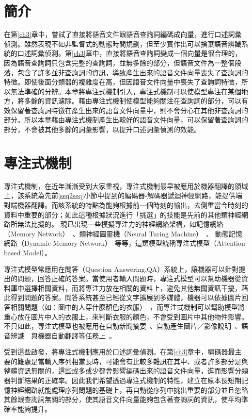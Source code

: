 \label{ch4}
\section{簡介}
在第\ref{ch3}章中，嘗試了直接將語音文件跟語音查詢詞編碼成向量，進行口述詞彙偵測。雖然表現不如非監督式的動態時間規劃，但至少實作出可以捨棄語音辨識系統的口述詞彙偵測。第\ref{ch3}章中，直接將語音查詢詞變成一個向量是很合理的，因為語音查詢詞只包含完整的查詢詞，並無多餘的部分，但語音文件為一整個段落，包含了許多並非查詢詞的資訊，導致產生出來的語音文件向量喪失了查詢詞的特徵。即使後面分類器的複雜度在高，但因語音文件向量中喪失了查詢詞特徵，所以無法準確的分辨。本章將專注式機制引入，專注式機制可以使模型專注在某個地方，將多餘的資訊濾除。藉由專注式機制使模型能夠關注在查詢詞的部分，可以有效保留著查詢詞特徵在產生出來的語音文件向量中，則不會分心在其他非查詢詞的部分。所以本章藉由專注式機制產生出較好的語音文件向量，可以保留著查詢詞的部分，不會被其他多餘的詞彙影響，以提升口述詞彙偵測的效能。
\vspace{10cm}
\section{專注式機制}
專注式機制，在近年漸漸受到大家重視，專注式機制最早被應用於機器翻譯的領域上，該系統為先前\ref{seq2seq}小節中提到的編碼器-解碼器遞迴神經網路，能提供端對端機器翻譯。而該系統的特點為能夠根據前一個時刻的輸出，去側重當今時刻的資料中重要的部分；如此這種根據狀況進行「挑選」的技能是先前的其他類神經網路所無法比擬的。
現已出現一些模擬專注力的神經網絡架構，如記憶網絡（Memory
Network）~\cite{sukhbaatar2015end}、類神經圖靈機（Neural Turing
Machine）~\cite{graves2014neural}、 動態記憶網路（Dynamic
Memory
Network）~\cite{kumar2015ask}等等，這類模型統稱專注式模型（Attention-based
Model）。

專注式模型常應用在問答（Question
Answering,QA）系統上，讓機器可以針對提出的問題，回答正確的答案。當使用者輸入問題時，專注式模型可以幫助機器從資料庫中選擇相關資料，而將專注力放在相關的資料上，避免其他無關資訊干擾，藉此得到問題的答案。問答系統甚至已經從文字擴展到多媒體，機器可以依據圖片回答相關問題（如：圖中的人穿什麼顏色的衣服）~\cite{agrawal2015vqa}，而專注式機制可以幫助模型將重心放在圖片中人的衣服上，來判斷衣服的顏色，不會受到圖片中其他物件影響。不只如此，專注式模型也被應用在自動新聞摘要~\cite{rush2015neural}、自動產生圖片／影像說明~\cite{xu2015show}、語音辨識~\cite{chan2016listen}~與機器自動翻譯等任務上~\cite{bahdanau2014neural}。

受到這些啟發，將專注式機制應用於口述詞彙偵測。在第\ref{ch3}章中，編碼器最主要的難處是當輸入序列相當長時，可能會有比較多雜訊在其中、或者許多部分是與整體資訊無關的，這些或多或少都會影響編碼出來的語音文件向量，進而影響分類器判斷結果的正確率。因此我們希望透過專注式機制的特性，建立在原本長短期記憶神經網路就能處理序列問題的基礎上，再自動從序列中挑出重要的部分並且忽略其餘跟查詢詞無關的部分，使其語音文件向量能夠包含著查詢詞的資訊，使平均準確率能夠提升。
